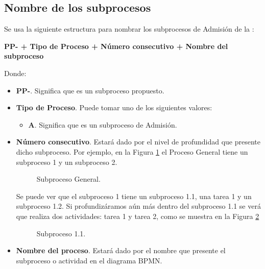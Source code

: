 \subsection{Nombre de los subprocesos}

\noindent Se usa la siguiente estructura para nombrar los subprocesos de Admisión de la :
	\begin{center}
		{\bf PP- + Tipo de Proceso + Número consecutivo + Nombre del subproceso}
	\end{center}

\noindent Donde:
\begin{itemize}
	\item{\bf PP-}. Significa que es un subproceso propuesto.
	\item{\bf Tipo de Proceso}. Puede tomar uno de los siguientes valores:
		\begin{itemize}
			\item{\bf A}. Significa que es un subproceso de Admisión.
		\end{itemize}
	\item{\bf Número consecutivo}. Estará dado por el nivel de profundidad que presente dicho subproceso. Por ejemplo, en la Figura \ref{Intro:JerarquiaProcesos} el Proceso General tiene un subproceso 1 y un subproceso 2.
		\begin{figure}[!h]
		\centering{}%
		\caption{Subproceso General.}
		\label{Intro:JerarquiaProcesos}
		\end{figure}

		Se puede ver que el subproceso 1 tiene un subproceso 1.1, una tarea 1 y un subproceso 1.2. Si profundizáramos aún más dentro del subproceso 1.1 se verá que realiza dos actividades: tarea 1 y tarea 2, como se muestra en la Figura \ref{Intro:JerarquiaProcesos2}
		\begin{figure}[!h]
		\centering{}%
		\caption{Subproceso 1.1.}
		\label{Intro:JerarquiaProcesos2}
		\end{figure}

	\item{\bf Nombre del proceso}. Estará dado por el nombre que presente el subproceso o actividad en el diagrama BPMN.
\end{itemize}

